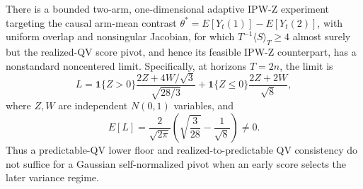 There is a bounded two-arm, one-dimensional adaptive IPW-Z experiment targeting the causal arm-mean contrast \(\theta^*=E[Y_t(1)]-E[Y_t(2)]\), with uniform overlap and nonsingular Jacobian, for which \(T^{-1}\langle S\rangle_T\ge4\) almost surely but the realized-QV score pivot, and hence its feasible IPW-Z counterpart, has a nonstandard noncentered limit. Specifically, at horizons \(T=2n\), the limit is
\[
 L=\mathbf1\{Z>0\}\frac{2Z+4W/\sqrt3}{\sqrt{28/3}}
 +\mathbf1\{Z\le0\}\frac{2Z+2W}{\sqrt8},
\]
where \(Z,W\) are independent \(N(0,1)\) variables, and
\[
 E[L]=\frac{2}{\sqrt{2\pi}}
 \left(\sqrt{\frac3{28}}-\frac1{\sqrt8}\right)\ne0.
\]
Thus a predictable-QV lower floor and realized-to-predictable QV consistency do not suffice for a Gaussian self-normalized pivot when an early score selects the later variance regime.